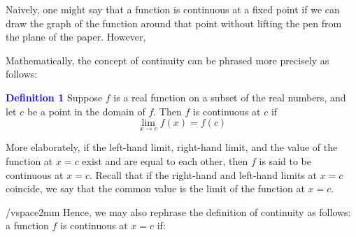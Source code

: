 										\hspace{1cm} 
										Naively, one might say that a function is continuous at a fixed point if we can draw the graph of the function around that point without lifting the pen from the plane of the paper. However, 

										\hspace{1cm} Mathematically, the concept of continuity can be phrased more precisely as follows:

										\vspace{2cm}

										    \textbf{\textcolor{blue}{Definition 1}} Suppose \( f \) is a real function on a subset of the real numbers, and let \( c \) be a point in the domain of \( f \). Then \( f \) is continuous at \( c \) if
										        \[
											    \lim_{x \to c} f(x) = f(c)
											        \]

												More elaborately, if the left-hand limit, right-hand limit, and the value of the function at \( x = c \) exist and are equal to each other, then \( f \) is said to be continuous at \( x = c \). Recall that if the right-hand and left-hand limits at \( x = c \) coincide, we say that the common value is the limit of the function at \( x = c \). 

												/vspace{2mm}
												Hence, we may also rephrase the definition of continuity as follows: a function \( f \) is continuous at \( x = c \) if:

												

